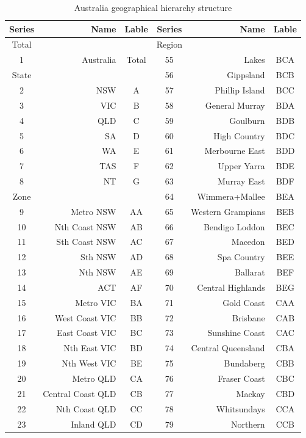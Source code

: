 \documentclass[11pt,a4paper,]{article}
\begin{document}
\begin{table}

\caption{\label{tab:Australiageographicaldivision}Australia geographical hierarchy structure}
\centering
\fontsize{9}{11}\selectfont
\begin{tabular}[t]{crccrc}
\toprule
Series & Name & Lable & Series & Name & Lable\\
\midrule
Total &  &  & Region &  & \\
1 & Australia & Total & 55 & Lakes & BCA\\
State &  &  & 56 & Gippsland & BCB\\
2 & NSW & A & 57 & Phillip Island & BCC\\
3 & VIC & B & 58 & General Murray & BDA\\
4 & QLD & C & 59 & Goulburn & BDB\\
5 & SA & D & 60 & High Country & BDC\\
6 & WA & E & 61 & Merbourne East & BDD\\
7 & TAS & F & 62 & Upper Yarra & BDE\\
8 & NT & G & 63 & Murray East & BDF\\
Zone &  &  & 64 & Wimmera+Mallee & BEA\\
9 & Metro NSW & AA & 65 & Western Grampians & BEB\\
10 & Nth Coast NSW & AB & 66 & Bendigo Loddon & BEC\\
11 & Sth Coast NSW & AC & 67 & Macedon & BED\\
12 & Sth NSW & AD & 68 & Spa Country & BEE\\
13 & Nth NSW & AE & 69 & Ballarat & BEF\\
14 & ACT & AF & 70 & Central Highlands & BEG\\
15 & Metro VIC & BA & 71 & Gold Coast & CAA\\
16 & West Coast VIC & BB & 72 & Brisbane & CAB\\
17 & East Coast VIC & BC & 73 & Sunshine Coast & CAC\\
18 & Nth East VIC & BD & 74 & Central Queensland & CBA\\
19 & Nth West VIC & BE & 75 & Bundaberg & CBB\\
20 & Metro QLD & CA & 76 & Fraser Coast & CBC\\
21 & Central Coast QLD & CB & 77 & Mackay & CBD\\
22 & Nth Coast QLD & CC & 78 & Whitsundays & CCA\\
23 & Inland QLD & CD & 79 & Northern & CCB\\

\end{tabular}
\end{table}
\end{document}
